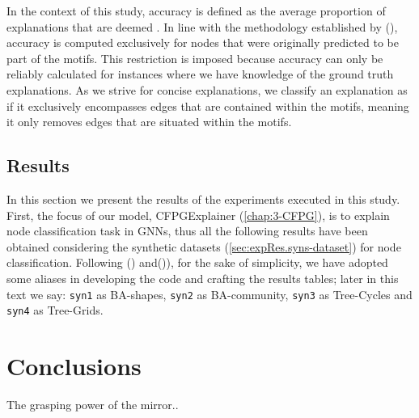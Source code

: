 \documentclass[binding=0.6cm]{sapthesis}
\newcommand{\mycite}[1]{(\cite{#1})}
\begin{document}
In the context of this study, accuracy is defined as the average proportion of explanations that are deemed . In line with the methodology established by \mycite{ying2019-gnnexplainer,luo2020-pgexplainer}, accuracy is computed exclusively for nodes that were originally predicted to be part of the motifs. This restriction is imposed because accuracy can only be reliably calculated for instances where we have knowledge of the ground truth explanations.
As we strive for concise explanations, we classify an explanation as  if it exclusively encompasses edges that are contained within the motifs, meaning it only removes edges that are situated within the motifs.


\newpage
\section{Results}
\label{sec:expRes.res}
In this section we present the results of the experiments executed in this study. First, the focus of our model, CFPGExplainer (\cref{chap:3-CFPG}), is to explain node classification task in GNNs, thus all the following results have been obtained considering the synthetic datasets (\cref{sec:expRes.syns-dataset}) for node classification. Following \mycite{luo2020-pgexplainer} and\mycite{spinelli2022-mate-maml}), for the sake of simplicity, we have adopted some aliases in developing the code and crafting the results tables; later in this text we say: \texttt{syn1} as BA-shapes, \texttt{syn2} as BA-community, \texttt{syn3} as Tree-Cycles and \texttt{syn4} as Tree-Grids.






\chapter{Conclusions}
\label{chap:5-conclusions} 
The grasping power of the mirror..




\backmatter
\cleardoublepage %

\printbibheading
\printbibliography[type=article,heading=subbibliography,title={Articles}]
\printbibliography[type=inbook,heading=subbibliography,title={Inproceedings}]
\printbibliography[type=book,heading=subbibliography,title={Books}]
\printbibliography[type=misc,heading=subbibliography,title={Miscellaneous}]
\end{document}
